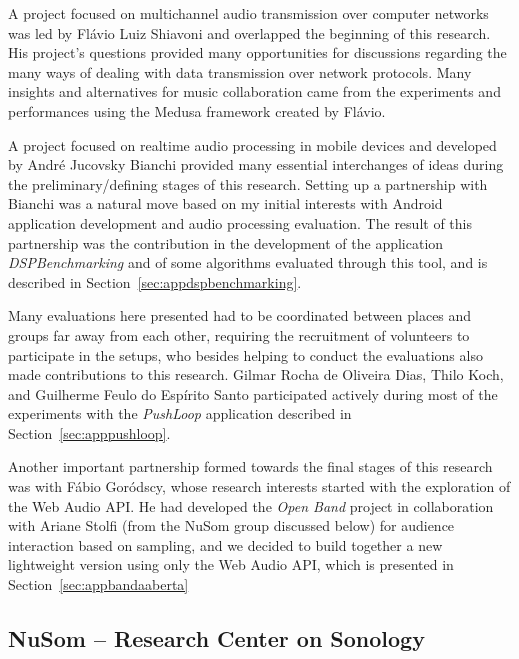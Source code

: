 A project focused on multichannel audio transmission over computer networks was led by Flávio Luiz Shiavoni and overlapped the beginning of this research.
His project's questions provided many opportunities for discussions regarding the many ways of dealing with data transmission over network protocols.
Many insights and alternatives for music collaboration came from the experiments and performances using the Medusa framework created by Flávio.

A project focused on realtime audio processing in mobile devices and developed by André Jucovsky Bianchi provided many essential interchanges of ideas during the preliminary/defining stages of this research.
Setting up a partnership with Bianchi was a natural move based on my initial interests with Android application development and audio processing evaluation.
The result of this partnership was the contribution in the development of the application \textit{DSPBenchmarking} and of some algorithms evaluated through this tool, and is described in Section~\ref{sec:appdspbenchmarking}.

Many evaluations here presented had to be coordinated between places and groups far away from each other, requiring the recruitment of volunteers to participate in the setups, who besides helping to conduct the evaluations also made contributions to this research.
Gilmar Rocha de Oliveira Dias, Thilo Koch, and Guilherme Feulo do Espírito Santo participated actively during most of the experiments with the \textit{PushLoop} application described in Section~\ref{sec:apppushloop}.

Another important partnership formed towards the final stages of this research was with Fábio Goródscy, whose research interests started with the exploration of the Web Audio API.
He had developed the \textit{Open Band} project in collaboration with Ariane Stolfi (from the NuSom group discussed below) for audience interaction based on sampling, and we decided to build together a new lightweight version using only the Web Audio API, which is presented in Section~\ref{sec:appbandaaberta}


\subsection*{NuSom – Research Center on Sonology}

